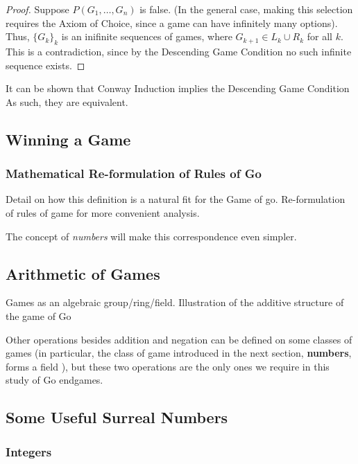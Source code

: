 \documentclass[../math194_paper.tex]{subfiles}
\begin{document}
\begin{proof}
    Suppose $P(G_1, \ldots, G_n)$ is false. 
    (In the general case, making this selection requires the Axiom of Choice,
    since a game can have infinitely many options).
    Thus, $\{G_k\}_k$ is an inifinite sequences of games, where $G_{k+1} \in L_k \cup R_k$
    for all $k$. This is a contradiction, since by the Descending Game Condition no 
    such infinite sequence exists. 
\end{proof}

It can be shown that Conway Induction implies the Descending Game Condition \cite{schleicher2006introduction}
As such, they are equivalent.

\subsection{Winning a Game}

\subsubsection{Mathematical Re-formulation of Rules of Go}
Detail on how this definition is a natural fit for the Game of go. 
Re-formulation of rules of game for more convenient analysis.

The concept of \textit{numbers} will make this correspondence even simpler.

\subsection{Arithmetic of Games}
Games as an algebraic group/ring/field. Illustration of the additive 
structure of the game of Go

Other operations besides addition and negation can be defined on some 
classes of games (in particular, the class of game introduced in the next section, 
\textbf{numbers}, forms a field \cite{schleicher2006introduction}),
 but these two operations are the only ones we require in this study of Go endgames. 

\subsection{Some Useful Surreal Numbers}

\subsubsection{Integers} 
\end{document}
